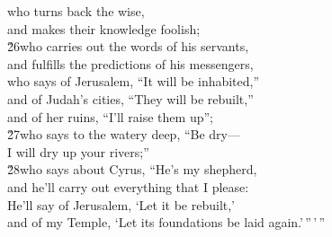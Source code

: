 \begin{poetry}
\poeml who turns back the wise, \\
\poemll    and makes their knowledge foolish; \\
\poeml \v{26}who carries out the words of his servants, \\
\poemll    and fulfills the predictions of his messengers, \\
\poeml who says of Jerusalem, ``It will be inhabited,'' \\
\poemll    and of Judah's cities, ``They will be rebuilt,'' \\
\poeml and of her ruins, ``I'll raise them up''; \\
\poeml \v{27}who says to the watery deep, ``Be dry--- \\
\poemll    I will dry up your rivers;'' \\
\poeml \v{28}who says about Cyrus, ``He's my shepherd, \\
\poemll    and he'll carry out everything that I please: \\
\poeml He'll say of Jerusalem, `Let it be rebuilt,' \\
\poemll    and of my Temple, `Let its foundations be laid again.'\,''\,'\,''
\end{poetry}

